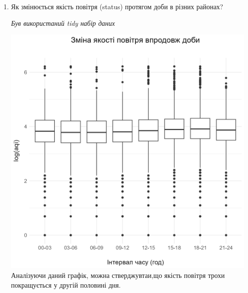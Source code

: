 \documentclass{article}
\begin{document}
\begin{enumerate}
    \item Як змінюється якість повітря (status) протягом доби в різних районах?
    
    \quad \textit{Був використаний tidy набір даних}

    \includegraphics[width=6in]{question3/box.png}
    Аналізуючи даний графік, можна стверджувтаи,що якість повітря трохи покращується у другій половині дня.
    

\end{enumerate}
\end{document}
